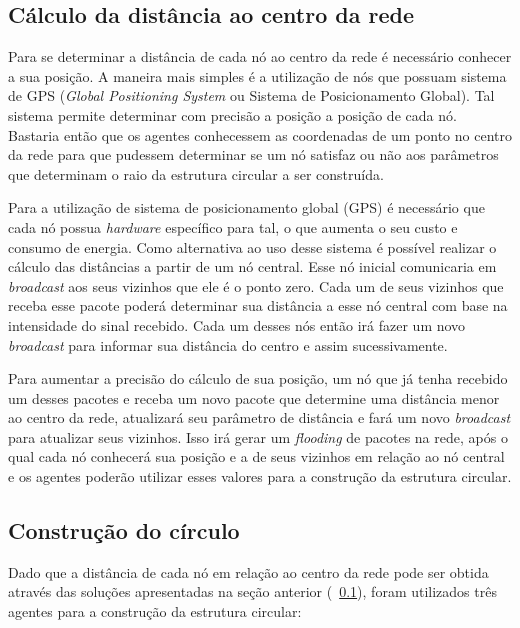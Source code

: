 \subsection{Cálculo da distância ao centro da rede}
\label{sec:calculoDistancia}

Para se determinar a distância de cada nó ao centro da rede é necessário conhecer a sua posição. A maneira mais simples é a utilização de nós que possuam sistema de GPS (\emph{Global Positioning System} ou Sistema de Posicionamento Global). Tal sistema permite determinar com precisão a posição a posição de cada nó. Bastaria então que os agentes conhecessem as coordenadas de um ponto no centro da rede para que pudessem determinar se um nó satisfaz ou não aos parâmetros que determinam o raio da estrutura circular a ser construída.

Para a utilização de sistema de posicionamento global (GPS) é necessário que cada nó possua \emph{hardware} específico para tal, o que aumenta o seu custo e consumo de energia. Como alternativa ao uso desse sistema é possível realizar o cálculo das distâncias a partir de um nó central. Esse nó inicial comunicaria em \emph{broadcast} aos seus vizinhos que ele é o ponto zero. Cada um de seus vizinhos que receba esse pacote poderá determinar sua distância a esse nó central com base na intensidade do sinal recebido.  Cada um desses nós então irá fazer um novo \emph{broadcast} para informar sua distância do centro e assim sucessivamente. 

Para aumentar a precisão do cálculo de sua posição, um nó que já tenha recebido um desses pacotes e receba um novo pacote que determine uma distância menor ao centro da rede, atualizará seu parâmetro de distância e fará um novo \emph{broadcast} para atualizar seus vizinhos. Isso irá gerar um \emph{flooding} de pacotes na rede, após o qual cada nó conhecerá sua posição e a de seus vizinhos em relação ao nó central e os agentes poderão utilizar esses valores para a construção da estrutura circular. 

\subsection{Construção do círculo}
\label{sec:circleBuilding}

Dado que a distância de cada nó em relação ao centro da rede pode ser obtida através das soluções apresentadas na seção anterior (~\ref{sec:calculoDistancia}), foram utilizados três agentes para a construção da estrutura circular: 

